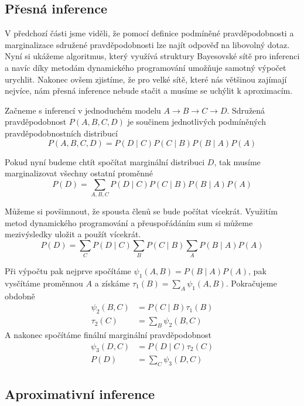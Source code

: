 \subsection{Přesná inference}

V předchozí části jsme viděli, že pomocí definice podmíněné pravděpodobnosti a marginalizace sdružené pravděpodobnosti lze najít odpověď na libovolný dotaz. 
Nyní si ukážeme algoritmus, který využívá struktury Bayesovské sítě pro inferenci a navíc díky metodám dynamického programování umožňuje samotný výpočet urychlit.
Nakonec ovšem zjistíme, že pro velké sítě, které nás většinou zajímají nejvíce, nám přesná inference nebude stačit a musíme se uchýlit k aproximacím.

Začneme s inferencí v jednoduchém modelu $A \rightarrow B \rightarrow C \rightarrow D$.
Sdružená pravděpodobnost $P(A, B, C, D)$ je součinem jednotlivých podmíněných pravděpodobnostních distribucí
\begin{equation}
P(A, B, C, D) = P(D \mid C) P(C \mid B) P(B \mid A) P(A)
\end{equation}

Pokud nyní budeme chtít spočítat marginální distribuci $D$, tak musíme marginalizovat všechny ostatní proměnné
\begin{equation}
P(D) = \sum_{A, B, C} P(D \mid C) P(C \mid B) P(B \mid A) P(A)
\end{equation}

Můžeme si povšimnout, že spousta členů se bude počítat vícekrát.
Využitím metod dynamického programování a přeuspořádáním sum si můžeme mezivýsledky uložit a použít vícekrát.
\begin{equation}
P(D) = \sum_C P(D \mid C) \sum_B P(C \mid B) \sum_A P(B \mid A) P(A)
\end{equation}

Při výpočtu pak nejprve spočítáme $\psi_1(A, B) =  P(B \mid A) P(A)$,  pak vysčítáme proměnnou $A$ a získáme $\tau_1(B) = \sum_A \psi_1(A, B)$.
Pokračujeme obdobně
\begin{align}
    \psi_2(B, C) &= P(C \mid B) \tau_1(B) \\
    \tau_2(C) &= \sum_B \psi_2(B, C)
\end{align}
A nakonec spočítáme finální marginální pravděpodobnost
\begin{align}
    \psi_3(D, C) &= P(D \mid C) \tau_2(C) \\
    P(D) &= \sum_C \psi_3(D, C)
\end{align}



\subsection{Aproximativní inference}
